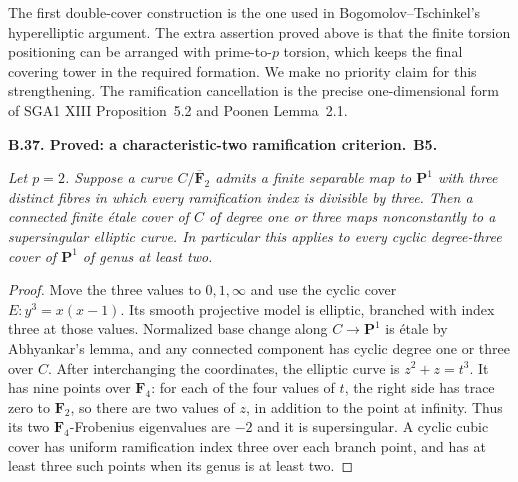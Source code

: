 \documentclass[11pt,a4paper]{article}
\newcommand{\F}{\mathbf F}
\newenvironment{claim}[3]{\par\medskip\noindent\hypertarget{#1}{\textbf{#1. #2.}}\ \textbf{#3.}\par\nopagebreak\smallskip\begingroup\itshape}{\endgroup\par\smallskip}
\begin{document}
The first double-cover construction is the one used in
Bogomolov--Tschinkel's hyperelliptic argument. The extra assertion
proved above is that the finite torsion positioning can be arranged
with prime-to-$p$ torsion, which keeps the final covering tower in
the required formation. We make no priority claim for this
strengthening. The ramification cancellation is the precise
one-dimensional form of SGA1 XIII Proposition~5.2 and Poonen
Lemma~2.1.\citep{LA_BogomolovTschinkel2002,LA_Poonen2005,LA_SGA1}

\begin{claim}{B.37}{Proved: a characteristic-two ramification criterion}{B5}
Let $p=2$. Suppose a curve $C/\overline{\F}_2$ admits a finite
separable map to $\mathbf P^1$ with three distinct fibres in which
every ramification index is divisible by three. Then a connected
finite \'etale cover of $C$ of degree one or three maps nonconstantly
to a supersingular elliptic curve. In particular this applies to
every cyclic degree-three cover of $\mathbf P^1$ of genus at least
two.
\end{claim}
\begin{proof}
Move the three values to $0,1,\infty$ and use the cyclic cover
$E:y^3=x(x-1)$. Its smooth projective model is elliptic, branched
with index three at those values. Normalized base change along
$C\to\mathbf P^1$ is \'etale by Abhyankar's lemma, and any
connected component has cyclic degree one or three over $C$.
After interchanging the coordinates, the elliptic curve is
$z^2+z=t^3$. It has nine points over $\F_4$: for each of the four
values of $t$, the right side has trace zero to $\F_2$, so there
are two values of $z$, in addition to the point at infinity.
Thus its two $\F_4$-Frobenius eigenvalues are $-2$ and it is
supersingular. A cyclic cubic cover has uniform ramification
index three over each branch point, and has at least three such
points when its genus is at least two.
\end{proof}
\end{document}

